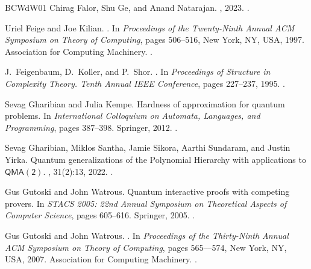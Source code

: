 \documentclass[10pt,a4paper]{article}
\theoremstyle{definition}
\begin{document}
\begin{thebibliography}{BCWdW01}
Chirag Falor, Shu Ge, and Anand Natarajan.
, 2023.
\newblock \href {http://arxiv.org/abs/2311.12228} {}.

Uriel Feige and Joe Kilian.
.
\newblock In {\em Proceedings of the Twenty-Ninth Annual ACM Symposium on
  Theory of Computing}, pages 506--516, New York, NY, USA, 1997. Association
  for Computing Machinery.
\newblock \href {https://doi.org/10.1145/258533.258644}
  {}.

J.~Feigenbaum, D.~Koller, and P.~Shor.
.
\newblock In {\em Proceedings of Structure in Complexity Theory. Tenth Annual
  IEEE Conference}, pages 227--237, 1995.
\newblock \href {https://doi.org/10.1109/SCT.1995.514861}
  {}.

Sevag Gharibian and Julia Kempe.
\newblock Hardness of approximation for quantum problems.
\newblock In {\em International Colloquium on Automata, Languages, and
  Programming}, pages 387--398. Springer, 2012.
\newblock \href {https://doi.org/10.1007/978-3-642-31594-7_33}
  {}.

Sevag Gharibian, Miklos Santha, Jamie Sikora, Aarthi Sundaram, and Justin
  Yirka.
\newblock Quantum generalizations of the {P}olynomial {H}ierarchy with
  applications to {$\mathsf{QMA(2)}$}.
, 31(2):13, 2022.
\newblock \href {https://doi.org/10.1007/s00037-022-00231-8}
  {}.

Gus Gutoski and John Watrous.
\newblock Quantum interactive proofs with competing provers.
\newblock In {\em STACS 2005: 22nd Annual Symposium on Theoretical Aspects of
  Computer Science}, pages 605--616. Springer, 2005.
\newblock \href {https://doi.org/10.1007/978-3-540-31856-9_50}
  {}.

Gus Gutoski and John Watrous.
.
\newblock In {\em Proceedings of the Thirty-Ninth Annual ACM Symposium on
  Theory of Computing}, pages 565–--574, New York, NY, USA, 2007. Association
  for Computing Machinery.
\newblock \href {https://doi.org/10.1145/1250790.1250873}
  {}.


\end{thebibliography}
\end{document}
